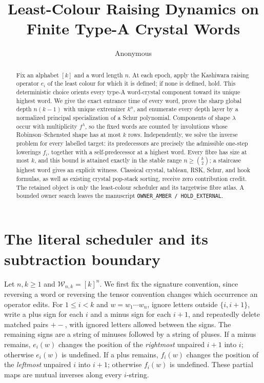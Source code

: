\documentclass[a4paper,10pt]{amsart}
\title[Least-raising dynamics on crystal words]{Least-Colour Raising Dynamics on Finite Type-A Crystal Words}
\author{Anonymous}
\date{}
\theoremstyle{remark}
\newcommand{\Words}{\mathcal W}
\begin{document}
\begin{abstract}
Fix an alphabet $[k]$ and a word length $n$.  At each epoch, apply the
Kashiwara raising operator $e_i$ of the least colour for which it is defined;
if none is defined, hold.  This deterministic choice orients every type-A
word-crystal component toward its unique highest word.  We give the exact
entrance time of every word, prove the sharp global depth $n(k-1)$ with unique
extremizer $k^n$, and enumerate every depth layer by a normalized principal
specialization of a Schur polynomial.  Components of shape $\lambda$ occur
with multiplicity $f^\lambda$, so the fixed words are counted by involutions
whose Robinson--Schensted shape has at most $k$ rows.  Independently, we solve
the inverse problem for every labelled target: its predecessors are precisely
the admissible one-step lowerings $f_i$, together with a self-predecessor at a
highest word.  Every fibre has size at most $k$, and this bound is attained
exactly in the stable range $n\geq\binom{k}{2}$; a staircase highest word gives
an explicit witness.  Classical crystal, tableau, RSK, Schur, and hook
formulas, as well as existing crystal pop-stack sorting, receive zero
contribution credit.  The retained object is only the
least-colour scheduler and its targetwise fibre atlas.  A bounded owner search
leaves the manuscript \texttt{OWNER\_AMBER / HOLD\_EXTERNAL}.
\end{abstract}

\maketitle

\section{The literal scheduler and its subtraction boundary}

Let $n,k\geq1$ and $\Words_{n,k}=[k]^n$.  We first fix the signature
convention, since reversing a word or reversing the tensor convention changes
which occurrence an operator edits.  For $1\leq i<k$ and
$w=w_1\cdots w_n$, ignore letters outside $\{i,i+1\}$, write a plus sign for
each $i$ and a minus sign for each $i+1$, and repeatedly delete matched pairs
$+-$, with ignored letters allowed between the signs.  The remaining signs
are a string of minuses followed by a string of pluses.  If a minus remains,
$e_i(w)$ changes the position of the \emph{rightmost} unpaired $i+1$ into
$i$; otherwise $e_i(w)$ is undefined.  If a plus remains, $f_i(w)$ changes
the position of the \emph{leftmost} unpaired $i$ into $i+1$; otherwise
$f_i(w)$ is undefined.  These partial maps are mutual inverses along every
$i$-string.
\end{document}
